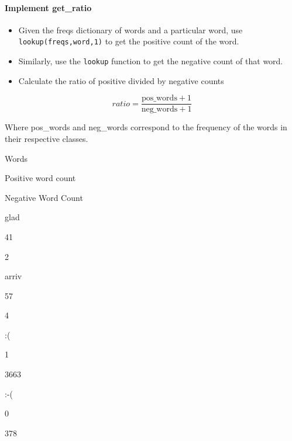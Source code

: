 \documentclass[11pt]{article}
\providecommand{\tightlist}{%
      \setlength{\itemsep}{0pt}\setlength{\parskip}{0pt}}
\begin{document}
\hypertarget{implement-get_ratio}{%
\paragraph{Implement get\_ratio}\label{implement-get_ratio}}

\begin{itemize}
\tightlist
\item
  Given the freqs dictionary of words and a particular word, use
  \texttt{lookup(freqs,word,1)} to get the positive count of the word.
\item
  Similarly, use the \texttt{lookup} function to get the negative count
  of that word.
\item
  Calculate the ratio of positive divided by negative counts
\end{itemize}

\[ ratio = \frac{\text{pos_words} + 1}{\text{neg_words} + 1} \]

Where pos\_words and neg\_words correspond to the frequency of the words
in their respective classes.

Words

Positive word count

Negative Word Count

glad

41

2

arriv

57

4

:(

1

3663

:-(

0

378
\end{document}
